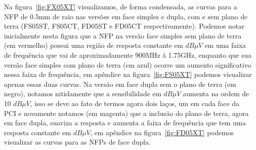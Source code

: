 Na figura~\ref{fig:FX05XT} visualizamos, de forma condensada, as curvas para a NFP de 0.5mm de raio nas versões em face simples e dupla, com e sem plano de terra (FS05ST, FS05CT, FD05ST e FD05CT respectivamente). Podemos notar inicialmente nesta figura que a NFP na versão face simples sem plano de terra (em vermelho) possui uma região de resposta constante em $dB \mu V$ em uma faixa de frequência que vai de aproximadamente 900MHz à 1.75GHz, enquanto que sua versão face simples com plano de terra (em azul) ocorre um aumento significativo nessa faixa de frequência, em apêndice na figura~\ref{fig:FS05XT} podemos visualizar apenas essas duas curvas. Na versão em face dupla sem o plano de terra (em negro), notamos nitidamente que a sensibilidade em $dB \mu V$ aumenta na ordem de 10 $dB \mu V$, isso se deve ao fato de termos agora dois laços, um em cada face da PCI e novamente notamos (em magenta) que a inclusão do plano de terra, agora em face dupla, suaviza a resposta e aumenta a faixa de frequência que tem uma resposta constante em $dB \mu V$, em apêndice na figura~\ref{fig:FD05XT} podemos visualizar as curvas para as NFPs de face dupla. 

